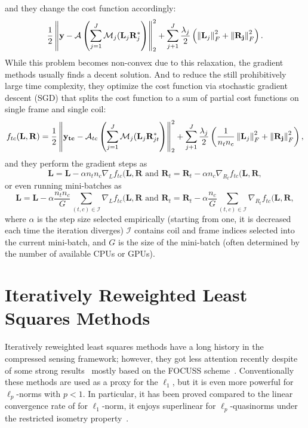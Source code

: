 and they change the cost function accordingly:
\[\frac{1}{2}\left\lVert\mathbf{y} - \mathcal{A}\left(\sum_{j=1}^J \mathcal{M}_j(\mathbf{L}_j\mathbf{R}_j^*\right)\right\rVert_2^2 + \sum_{j+1}^J \frac{\lambda_j}{2} \left(\left\lVert\mathbf{L}_j\right\rVert_F^2 + \left\lVert\mathbf{R_j}\right\rVert_F^2\right).\]
While this problem becomes non-convex due to this relaxation, the gradient methods usually finds a decent solution. And to reduce the still prohibitively large time complexity, they optimize the cost function via stochastic gradient descent (SGD) that splits the cost function to a sum of partial cost functions on single frame and single coil:
\[f_{tc}(\mathbf{L,R}) = \frac{1}{2}\left\lVert\mathbf{y_{tc}} - \mathcal{A}_{tc}\left(\sum_{j=1}^J \mathcal{M}_j(\mathbf{L}_j\mathbf{R}_{jt}^*\right)\right\rVert_2^2 + \sum_{j+1}^J \frac{\lambda_j}{2} \left(\frac{1}{n_t n_c}\left\lVert\mathbf{L}_j\right\rVert_F^2 + \left\lVert\mathbf{R_j}\right\rVert_F^2\right),\]
and they perform the gradient steps as
\[\mathbf{L} = \mathbf{L} - \alpha n_t n_c \nabla_L f_{tc}(\mathbf{L,R} \text{ and  } \mathbf{R}_t = \mathbf{R}_t - \alpha n_c \nabla_{R_t} f_{tc}(\mathbf{L,R},\]
or even running mini-batches as
\[\mathbf{L} = \mathbf{L} - \alpha \frac{n_t n_c}{G} \sum_{(t,c) \in \mathcal{I}} \nabla_L f_{tc}(\mathbf{L,R} \text{ and  } \mathbf{R}_t = \mathbf{R}_t - \alpha \frac{n_c}{G} \sum_{(t,c) \in \mathcal{I}} \nabla_{R_t} f_{tc}(\mathbf{L,R},\]
where $\alpha$ is the step size selected empirically (starting from one, it is decreased each time the iteration diverges) $\mathcal{I}$ contains coil and frame indices selected into the current mini-batch, and $G$ is the size of the mini-batch (often determined by the number of available CPUs or GPUs).

\section{Iteratively Reweighted Least Squares Methods}
Iteratively reweighted least squares methods have a long history in the compressed sensing framework; however, they got less attention recently despite of some strong results~\cite{ramani_accelerated_2010, ongie_fast_2017, majumdar_non-convex_2013, dong_compressive_2014, chen_fast_2015} mostly based on the FOCUSS scheme~\cite{gorodnitsky_neuromagnetic_1995}. Conventionally these methods are used as a proxy for the $\ell_1$, but it is even more powerful for $\ell_p$-norms with $p < 1$. In particular, it has been proved compared to the linear convergence rate of for $\ell_1$-norm, it enjoys superlinear for $\ell_p$-quasinorms under the restricted isometry property~\cite{chartrand_iteratively_2008, daubechies_iteratively_2010}.

